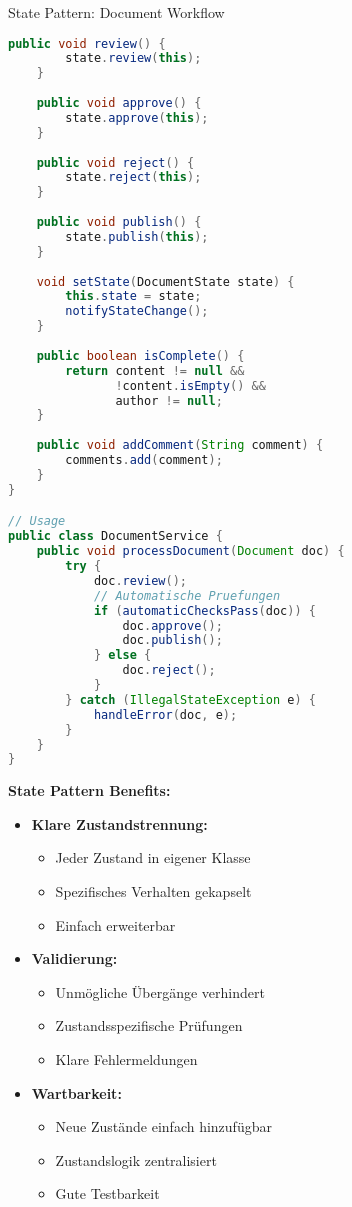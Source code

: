 \begin{example2}[breakable]{State Pattern: Document Workflow}
\begin{lstlisting}[language=Java, style=basesmol]
    public void review() {
        state.review(this);
    }
    
    public void approve() {
        state.approve(this);
    }
    
    public void reject() {
        state.reject(this);
    }
    
    public void publish() {
        state.publish(this);
    }
    
    void setState(DocumentState state) {
        this.state = state;
        notifyStateChange();
    }
    
    public boolean isComplete() {
        return content != null && 
               !content.isEmpty() && 
               author != null;
    }
    
    public void addComment(String comment) {
        comments.add(comment);
    }
}

// Usage
public class DocumentService {
    public void processDocument(Document doc) {
        try {
            doc.review();
            // Automatische Pruefungen
            if (automaticChecksPass(doc)) {
                doc.approve();
                doc.publish();
            } else {
                doc.reject();
            }
        } catch (IllegalStateException e) {
            handleError(doc, e);
        }
    }
}
\end{lstlisting}

\textbf{State Pattern Benefits:}
\begin{itemize}
    \item \textbf{Klare Zustandstrennung:}
    \begin{itemize}
        \item Jeder Zustand in eigener Klasse
        \item Spezifisches Verhalten gekapselt
        \item Einfach erweiterbar
    \end{itemize}
    
    \item \textbf{Validierung:}
    \begin{itemize}
        \item Unmögliche Übergänge verhindert
        \item Zustandsspezifische Prüfungen
        \item Klare Fehlermeldungen
    \end{itemize}
    
    \item \textbf{Wartbarkeit:}
    \begin{itemize}
        \item Neue Zustände einfach hinzufügbar
        \item Zustandslogik zentralisiert
        \item Gute Testbarkeit
    \end{itemize}
\end{itemize}
\end{example2}

